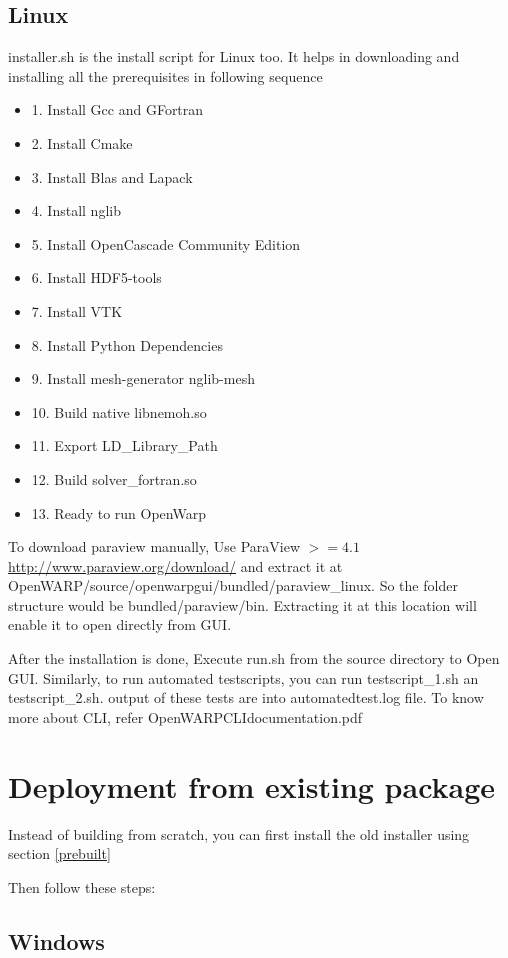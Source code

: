 \documentclass[12pt]{article}
\begin{document}
\subsection{Linux}
installer.sh is the install script for Linux too. It helps in downloading and installing all the prerequisites in following sequence
\begin{itemize}
\item 1. Install Gcc and GFortran
\item 2. Install Cmake
\item 3. Install Blas and Lapack
\item 4. Install nglib
\item 5. Install OpenCascade Community Edition
\item 6. Install HDF5-tools
\item 7. Install VTK 
\item 8. Install Python Dependencies 
\item 9. Install mesh-generator nglib-mesh
\item 10. Build native libnemoh.so
\item 11. Export LD_Library_Path
\item 12. Build solver_fortran.so
\item 13. Ready to run OpenWarp
\end{itemize}
To download paraview manually, Use ParaView $>=4.1$  \url{http://www.paraview.org/download/} and extract it at OpenWARP/source/openwarpgui/bundled/paraview_linux. So the folder structure would be bundled/paraview/bin. Extracting it at this location will enable it to open directly from GUI.

After the installation is done, Execute run.sh from the source directory to Open GUI.
 Similarly, to run automated testscripts, you can run testscript_1.sh an testscript_2.sh. output of these tests are into automatedtest.log file. To know more about CLI, refer OpenWARPCLIdocumentation.pdf

\section{Deployment from existing package }

Instead of building from scratch, you can first install the old installer using section \ref{prebuilt}

Then follow these steps:

\subsection{Windows}
\end{document}
